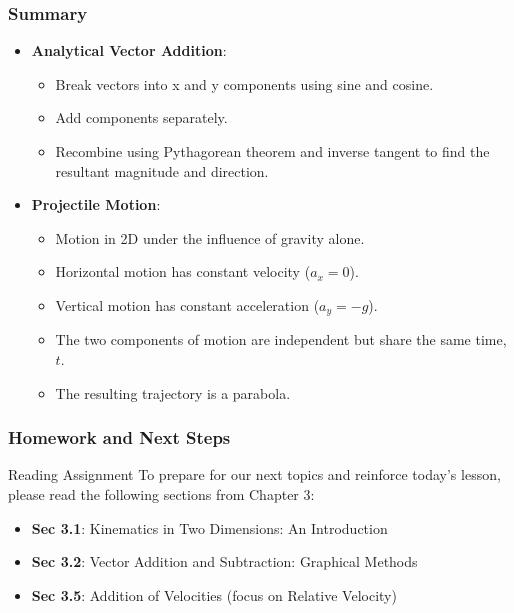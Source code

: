 \documentclass{beamer}
\begin{document}
\begin{frame}
\frametitle{Summary}
\begin{itemize}
    \item \textbf{Analytical Vector Addition}:
    \begin{itemize}
        \item Break vectors into x and y components using sine and cosine.
        \item Add components separately.
        \item Recombine using Pythagorean theorem and inverse tangent to find the resultant magnitude and direction.
    \end{itemize}
    \pause
    \item \textbf{Projectile Motion}:
    \begin{itemize}
        \item Motion in 2D under the influence of gravity alone.
        \item Horizontal motion has constant velocity ($a_x=0$).
        \item Vertical motion has constant acceleration ($a_y=-g$).
        \item The two components of motion are independent but share the same time, $t$.
        \item The resulting trajectory is a parabola.
    \end{itemize}
\end{itemize}
\end{frame}

\begin{frame}
\frametitle{Homework and Next Steps}

\begin{block}{Reading Assignment}
To prepare for our next topics and reinforce today's lesson, please read the following sections from Chapter 3:
\begin{itemize}
    \item \textbf{Sec 3.1}: Kinematics in Two Dimensions: An Introduction
    \item \textbf{Sec 3.2}: Vector Addition and Subtraction: Graphical Methods
    \item \textbf{Sec 3.5}: Addition of Velocities (focus on Relative Velocity)
\end{itemize}
\end{block}

\end{frame}
\end{document}
